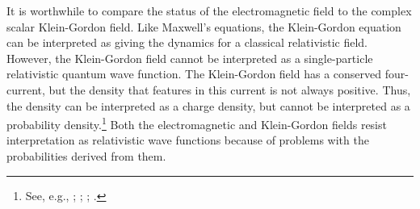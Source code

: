 \documentclass[12pt,secnumarabic,amsmath,amssymb,balancelastpage,nofootinbib]{article}
\begin{document}
It is worthwhile to compare the status of the electromagnetic field to the complex scalar Klein-Gordon field.  Like Maxwell's equations, the Klein-Gordon equation can be interpreted as giving the dynamics for a classical relativistic field.  However, the Klein-Gordon field cannot be interpreted as a single-particle relativistic quantum wave function.  The Klein-Gordon field has a conserved four-current, but the density that features in this current is not always positive.  Thus, the density can be interpreted as a charge density, but cannot be interpreted as a probability density.\footnote{See, e.g., \citet[pg.\ 884--888]{messiah1962}; \citet[sec.\ 2-1-1]{itzyksonzuber1980}; \citet[sec.\ 3.1 and 3.4]{hatfield}; \citet[sec.\ 2.2]{ryder1996}.}  Both the electromagnetic and Klein-Gordon fields resist interpretation as relativistic wave functions because of problems with the probabilities derived from them.
\end{document}
